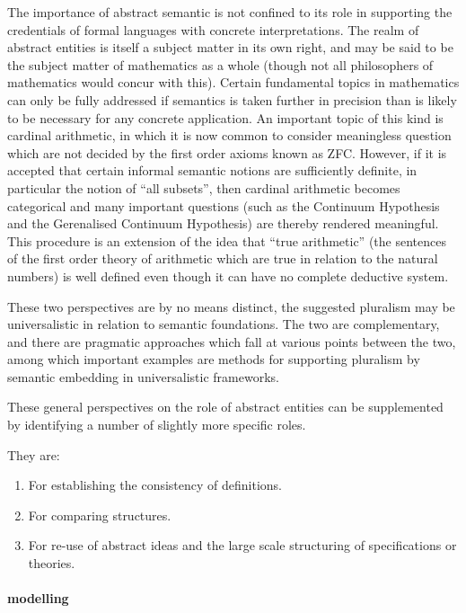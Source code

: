 \documentclass[numreferences]{book}
\begin{document}
The importance of abstract semantic is not confined to its role in supporting the credentials of formal languages with concrete interpretations.
The realm of abstract entities is itself a subject matter in its own right, and may be said to be the subject matter of mathematics as a whole (though not all philosophers of mathematics would concur with this).
Certain fundamental topics in mathematics can only be fully addressed if semantics is taken further in precision than is likely to be necessary for any concrete application.
An important topic of this kind is cardinal arithmetic, in which it is now common to consider meaningless question which are not decided by the first order axioms known as ZFC.
However, if it is accepted that certain informal semantic notions are sufficiently definite, in particular the notion of ``all subsets'', then cardinal arithmetic becomes categorical and many important questions (such as the Continuum Hypothesis and the Gerenalised Continuum Hypothesis) are thereby rendered meaningful.
This procedure is an extension of the idea that ``true arithmetic'' (the sentences of the first order theory of arithmetic which are true in relation to the natural numbers) is well defined even though it can have no complete deductive system.

These two perspectives are by no means distinct, the suggested pluralism may be universalistic in relation to semantic foundations.
The two are complementary, and there are pragmatic approaches which fall at various points between the two, among which important examples are methods for supporting pluralism by semantic embedding in universalistic frameworks.

These general perspectives on the role of abstract entities can be supplemented by identifying a number of slightly more specific roles.

They are:

\begin{enumerate}
\item For establishing the consistency of definitions.
\item For comparing structures.
\item For re-use of abstract ideas and the large scale structuring of specifications or theories.
\end{enumerate}

\paragraph{modelling}
\end{document}

